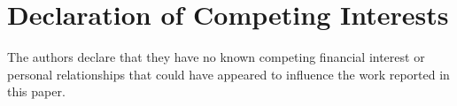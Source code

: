\section*{Declaration of Competing Interests}

The authors declare that they have no known competing financial interest or personal relationships that could have appeared to influence the work reported in this paper.